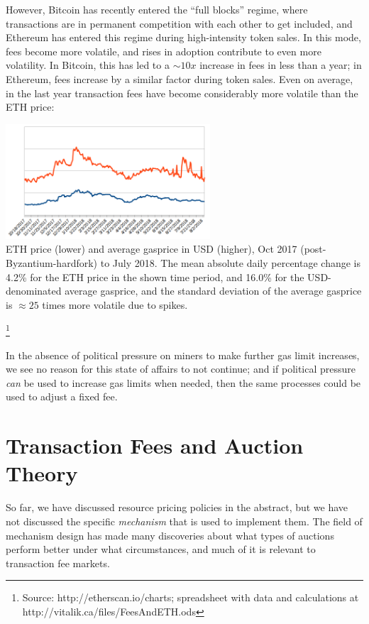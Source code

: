 \documentclass[12pt, final]{article}
\begin{document}
However, Bitcoin has recently entered the ``full blocks'' regime, where transactions are in permanent competition with each other to get included, and Ethereum has entered this regime during high-intensity token sales\cite{braveICO}. In this mode, fees become more volatile, and rises in adoption contribute to even more volatility. In Bitcoin, this has led to a $\sim 10x$ increase in fees in less than a year; in Ethereum, fees increase by a similar factor during token sales. Even on average, in the last year transaction fees have become considerably more volatile than the ETH price:

\begin{center}
\includegraphics[width=3in]{PriceAndFees.png} \\
\scriptsize{ETH price (lower) and average gasprice in USD (higher), Oct 2017 (post-Byzantium-hardfork) to July 2018. The mean absolute daily percentage change is 4.2\% for the ETH price in the shown time period, and 16.0\% for the USD-denominated average gasprice, and the standard deviation of the average gasprice is $\approx 25$ times more volatile due to spikes.}

\footnote{Source: http://etherscan.io/charts; spreadsheet with data and calculations at http://vitalik.ca/files/FeesAndETH.ods}
\end{center}

In the absence of political pressure on miners to make further gas limit increases, we see no reason for this state of affairs to not continue; and if political pressure \emph{can} be used to increase gas limits when needed, then the same processes could be used to adjust a fixed fee.

\section{Transaction Fees and Auction Theory}

So far, we have discussed resource pricing policies in the abstract, but we have not discussed the specific \emph{mechanism} that is used to implement them. The field of mechanism design has made many discoveries about what types of auctions perform better under what circumstances, and much of it is relevant to transaction fee markets.
\end{document}
